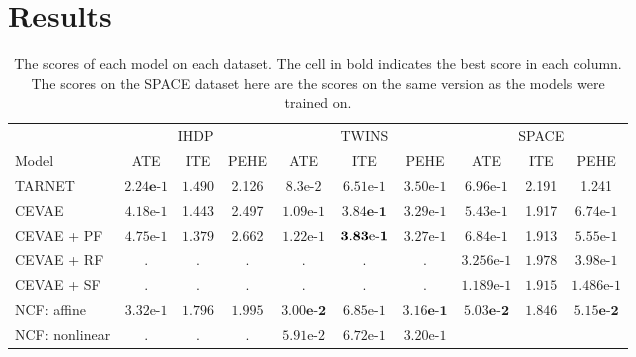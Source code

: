 \documentclass{report}
\begin{document}
\chapter{Results}

\renewcommand{\arraystretch}{1.3}
\begin{table}[]
    \centering
    \begin{adjustbox}{center}
    \begin{tabular}{l||c|c|c||c|c|c||c|c|c|}
        & \multicolumn{3}{|c||}{IHDP} & \multicolumn{3}{|c||}{TWINS} & \multicolumn{3}{|c|}{SPACE} \\ 
         Model & ATE & ITE & PEHE & ATE & ITE & PEHE & ATE & ITE & PEHE \\
         \hline \hline
         TARNET & $\mathbf{2.24\text{e-}}1$ & $1.490$ & 2.126 &   $8.3\text{e-}2$ & $6.51\text{e-}1$ & $3.50\text{e-}1$ &     $6.96\text{e-}1$ & 2.191 & 1.241\\
         \hline
         CEVAE & $4.18\text{e-}1$ & 1.443 & 2.497 &    $1.09\text{e-}1$ & $\mathbf{3.84\textbf{e-}1}$ & $3.29\text{e-}1$ & $5.43\text{e-}1$ & 1.917 & $6.74\text{e-}1$\\
         \hline
         CEVAE + PF & $4.75\text{e-}1$ & $\mathbf{1.379}$ &  2.662 & $1.22\text{e-}1$ & $\mathbf{3.83\text{\text{e-}}1}$ & $3.27\text{e-}1$ & $6.84\text{e-}1$ & 1.913 & $5.55\text{e-}1$ \\
         \hline
         CEVAE + RF & . & . & . &  . & . & . & $3.256\text{e-}1$ & $1.978$ & $3.98\text{e-}1$\\
         \hline 
         CEVAE + SF & . & . & . &  . & . & . & $1.189\text{e-}1$ & $1.915$ & $1.486\text{e-}1$\\
         \hline
         NCF: affine & $3.32\text{e-}1$ & $1.796$ & $\mathbf{1.995}$ &    $\mathbf{3.00\text{e-}2}$ & $6.85\text{e-}1$ & $\mathbf{3.16\text{e-}1}$ & \textbf{$\mathbf{5.03\text{e-}2}$} & $\mathbf{1.846}$ & \textbf{$\mathbf{5.15\text{e-}2}$} \\
         \hline
         NCF: nonlinear & . & . & . & $5.91\text{e-}2$ & $6.72\text{e-}1$ & $3.20\text{e-1}$\\
    \end{tabular}
    \end{adjustbox}
    \caption{The scores of each model on each dataset. The cell in bold indicates the best score in each column. The scores on the SPACE dataset here are the scores on the same version as the models were trained on.}
    \label{tab:results_experiments}
\end{table}
\end{document}
